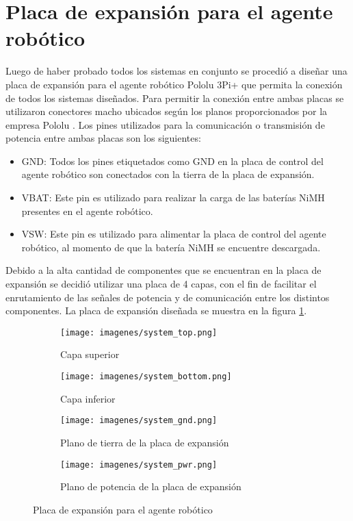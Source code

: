 \section{Placa de expansión para el agente robótico}

Luego de haber probado todos los sistemas en conjunto se procedió a diseñar
una placa de expansión para el agente robótico Pololu 3Pi+ que permita
la conexión de todos los sistemas diseñados. Para permitir la conexión
 entre ambas placas se utilizaron conectores 
macho ubicados según los planos proporcionados por la 
empresa Pololu \cite{noauthor_pololu_nodate}.
Los pines utilizados para la comunicación o transmisión de potencia entre
ambas placas son los siguientes:

\begin{itemize}
    \item GND: Todos los pines etiquetados como GND en la placa de control
    del agente robótico son conectados con la tierra de la placa de expansión.
    \item VBAT: Este pin es utilizado para realizar la carga de las baterías
    NiMH presentes en el agente robótico.
    \item VSW: Este pin es utilizado para alimentar la placa de 
    control del agente robótico, al momento de que la batería NiMH 
    se encuentre descargada.

\end{itemize}

Debido a la alta cantidad de componentes que se encuentran en la placa de expansión
se decidió utilizar una placa de 4 capas, con el fin de facilitar el enrutamiento
de las señales de potencia y de comunicación entre los distintos componentes. 
La placa de expansión diseñada se muestra en la figura \ref{fig:expansion_board}.

\begin{figure}[H]
    \centering
    \begin{subfigure}{0.45\textwidth}
        \centering
        \texttt{[image: imagenes/system\_top.png]}
        \caption{Capa superior}
    \end{subfigure}
    \begin{subfigure}{0.45\textwidth}
        \centering
        \texttt{[image: imagenes/system\_bottom.png]}
        \caption{Capa inferior}
    \end{subfigure}
    \vfill
    \begin{subfigure}{0.45\textwidth}
        \centering
        \texttt{[image: imagenes/system\_gnd.png]}
        \caption{Plano de tierra de la placa de expansión} 
    \end{subfigure}
    \begin{subfigure}{0.45\textwidth}
        \centering
        \texttt{[image: imagenes/system\_pwr.png]}
        \caption{Plano de potencia de la placa de expansión}
    \end{subfigure}

    \caption{Placa de expansión para el agente robótico}
    \label{fig:expansion_board}
\end{figure}

